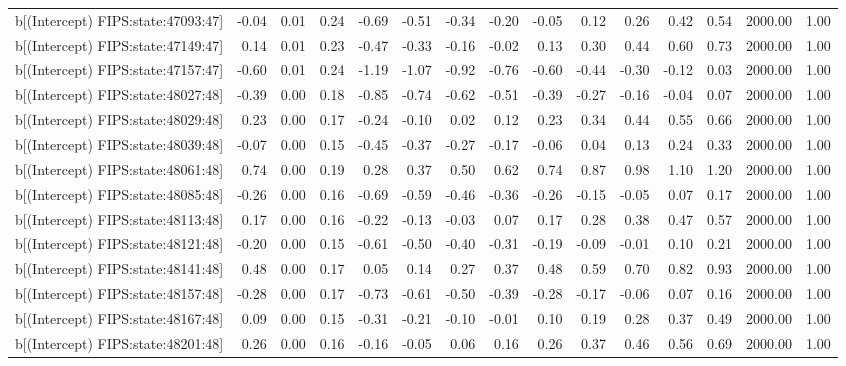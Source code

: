 \begin{table}[ht]
\begin{tabular}{rrrrrrrrrrrrrrr}
  b[(Intercept) FIPS:state:47093:47] & -0.04 & 0.01 & 0.24 & -0.69 & -0.51 & -0.34 & -0.20 & -0.05 & 0.12 & 0.26 & 0.42 & 0.54 & 2000.00 & 1.00 \\ 
  b[(Intercept) FIPS:state:47149:47] & 0.14 & 0.01 & 0.23 & -0.47 & -0.33 & -0.16 & -0.02 & 0.13 & 0.30 & 0.44 & 0.60 & 0.73 & 2000.00 & 1.00 \\ 
  b[(Intercept) FIPS:state:47157:47] & -0.60 & 0.01 & 0.24 & -1.19 & -1.07 & -0.92 & -0.76 & -0.60 & -0.44 & -0.30 & -0.12 & 0.03 & 2000.00 & 1.00 \\ 
  b[(Intercept) FIPS:state:48027:48] & -0.39 & 0.00 & 0.18 & -0.85 & -0.74 & -0.62 & -0.51 & -0.39 & -0.27 & -0.16 & -0.04 & 0.07 & 2000.00 & 1.00 \\ 
  b[(Intercept) FIPS:state:48029:48] & 0.23 & 0.00 & 0.17 & -0.24 & -0.10 & 0.02 & 0.12 & 0.23 & 0.34 & 0.44 & 0.55 & 0.66 & 2000.00 & 1.00 \\ 
  b[(Intercept) FIPS:state:48039:48] & -0.07 & 0.00 & 0.15 & -0.45 & -0.37 & -0.27 & -0.17 & -0.06 & 0.04 & 0.13 & 0.24 & 0.33 & 2000.00 & 1.00 \\ 
  b[(Intercept) FIPS:state:48061:48] & 0.74 & 0.00 & 0.19 & 0.28 & 0.37 & 0.50 & 0.62 & 0.74 & 0.87 & 0.98 & 1.10 & 1.20 & 2000.00 & 1.00 \\ 
  b[(Intercept) FIPS:state:48085:48] & -0.26 & 0.00 & 0.16 & -0.69 & -0.59 & -0.46 & -0.36 & -0.26 & -0.15 & -0.05 & 0.07 & 0.17 & 2000.00 & 1.00 \\ 
  b[(Intercept) FIPS:state:48113:48] & 0.17 & 0.00 & 0.16 & -0.22 & -0.13 & -0.03 & 0.07 & 0.17 & 0.28 & 0.38 & 0.47 & 0.57 & 2000.00 & 1.00 \\ 
  b[(Intercept) FIPS:state:48121:48] & -0.20 & 0.00 & 0.15 & -0.61 & -0.50 & -0.40 & -0.31 & -0.19 & -0.09 & -0.01 & 0.10 & 0.21 & 2000.00 & 1.00 \\ 
  b[(Intercept) FIPS:state:48141:48] & 0.48 & 0.00 & 0.17 & 0.05 & 0.14 & 0.27 & 0.37 & 0.48 & 0.59 & 0.70 & 0.82 & 0.93 & 2000.00 & 1.00 \\ 
  b[(Intercept) FIPS:state:48157:48] & -0.28 & 0.00 & 0.17 & -0.73 & -0.61 & -0.50 & -0.39 & -0.28 & -0.17 & -0.06 & 0.07 & 0.16 & 2000.00 & 1.00 \\ 
  b[(Intercept) FIPS:state:48167:48] & 0.09 & 0.00 & 0.15 & -0.31 & -0.21 & -0.10 & -0.01 & 0.10 & 0.19 & 0.28 & 0.37 & 0.49 & 2000.00 & 1.00 \\ 
  b[(Intercept) FIPS:state:48201:48] & 0.26 & 0.00 & 0.16 & -0.16 & -0.05 & 0.06 & 0.16 & 0.26 & 0.37 & 0.46 & 0.56 & 0.69 & 2000.00 & 1.00 \\ 

\end{tabular}
\end{table}
